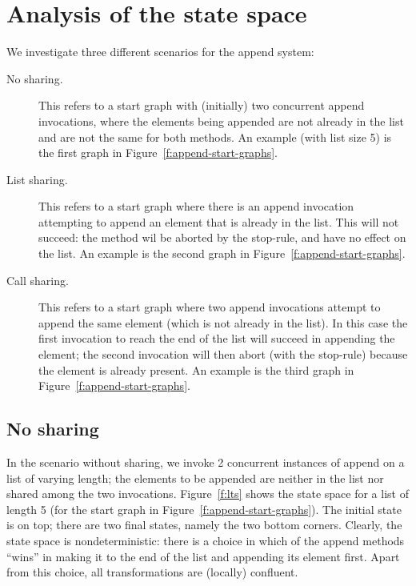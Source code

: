\documentclass[a4paper]{article}
\newcommand{\append}{\textsf{append}\xspace}
\newcommand{\stopR}{\textsf{stop}\xspace}
\begin{document}
\section{Analysis of the state space}

We investigate three different scenarios for the \append system:
\begin{description}
\item[No sharing.] This refers to a start graph with (initially) two concurrent
  \append invocations, where the elements being appended are not already in the
  list and are not the same for both methods. An example (with list size 5) is
  the first graph in Figure~\ref{f:append-start-graphs}.

\item[List sharing.] This refers to a start graph where there is an \append
  invocation attempting to append an element that is already in the list. This
  will not succeed: the method wil be aborted by the \stopR-rule, and have no
  effect on the list. An example is the second graph in
  Figure~\ref{f:append-start-graphs}.

\item[Call sharing.] This refers to a start graph where two \append invocations
  attempt to append the same element (which is not already in the list). In
  this case the first invocation to reach the end of the list will succeed in
  appending the element; the second invocation will then abort (with the
  \stopR-rule) because the element is already present. An example is the third
  graph in Figure~\ref{f:append-start-graphs}.
\end{description}

\subsection{No sharing}

In the scenario without sharing, we invoke 2 concurrent instances of \append on
a list of varying length; the elements to be appended are neither in the list
nor shared among the two invocations. Figure~\ref{f:lts} shows the state space
for a list of length 5 (for the start graph in
Figure~\ref{f:append-start-graphs}). The initial state is on top; there are two
final states, namely the two bottom corners. Clearly, the state space is
nondeterministic: there is a choice in which of the append methods ``wins'' in
making it to the end of the list and appending its element first. Apart from
this choice, all transformations are (locally) confluent.
\end{document}
